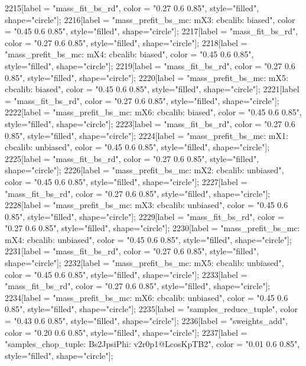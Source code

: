 {	2215[label = "mass_fit_bs_rd", color = "0.27 0.6 0.85", style="filled", shape="circle"];
	2216[label = "mass_prefit_bs_mc\nmassbin: mX3\nmassmodel: cbcalib\ntrigger: biased", color = "0.45 0.6 0.85", style="filled", shape="circle"];
	2217[label = "mass_fit_bs_rd", color = "0.27 0.6 0.85", style="filled", shape="circle"];
	2218[label = "mass_prefit_bs_mc\nmassbin: mX4\nmassmodel: cbcalib\ntrigger: biased", color = "0.45 0.6 0.85", style="filled", shape="circle"];
	2219[label = "mass_fit_bs_rd", color = "0.27 0.6 0.85", style="filled", shape="circle"];
	2220[label = "mass_prefit_bs_mc\nmassbin: mX5\nmassmodel: cbcalib\ntrigger: biased", color = "0.45 0.6 0.85", style="filled", shape="circle"];
	2221[label = "mass_fit_bs_rd", color = "0.27 0.6 0.85", style="filled", shape="circle"];
	2222[label = "mass_prefit_bs_mc\nmassbin: mX6\nmassmodel: cbcalib\ntrigger: biased", color = "0.45 0.6 0.85", style="filled", shape="circle"];
	2223[label = "mass_fit_bs_rd", color = "0.27 0.6 0.85", style="filled", shape="circle"];
	2224[label = "mass_prefit_bs_mc\nmassbin: mX1\nmassmodel: cbcalib\ntrigger: unbiased", color = "0.45 0.6 0.85", style="filled", shape="circle"];
	2225[label = "mass_fit_bs_rd", color = "0.27 0.6 0.85", style="filled", shape="circle"];
	2226[label = "mass_prefit_bs_mc\nmassbin: mX2\nmassmodel: cbcalib\ntrigger: unbiased", color = "0.45 0.6 0.85", style="filled", shape="circle"];
	2227[label = "mass_fit_bs_rd", color = "0.27 0.6 0.85", style="filled", shape="circle"];
	2228[label = "mass_prefit_bs_mc\nmassbin: mX3\nmassmodel: cbcalib\ntrigger: unbiased", color = "0.45 0.6 0.85", style="filled", shape="circle"];
	2229[label = "mass_fit_bs_rd", color = "0.27 0.6 0.85", style="filled", shape="circle"];
	2230[label = "mass_prefit_bs_mc\nmassbin: mX4\nmassmodel: cbcalib\ntrigger: unbiased", color = "0.45 0.6 0.85", style="filled", shape="circle"];
	2231[label = "mass_fit_bs_rd", color = "0.27 0.6 0.85", style="filled", shape="circle"];
	2232[label = "mass_prefit_bs_mc\nmassbin: mX5\nmassmodel: cbcalib\ntrigger: unbiased", color = "0.45 0.6 0.85", style="filled", shape="circle"];
	2233[label = "mass_fit_bs_rd", color = "0.27 0.6 0.85", style="filled", shape="circle"];
	2234[label = "mass_prefit_bs_mc\nmassbin: mX6\nmassmodel: cbcalib\ntrigger: unbiased", color = "0.45 0.6 0.85", style="filled", shape="circle"];
	2235[label = "samples_reduce_tuple", color = "0.43 0.6 0.85", style="filled", shape="circle"];
	2236[label = "sweights_add", color = "0.20 0.6 0.85", style="filled", shape="circle"];
	2237[label = "samples_chop_tuple\nmode: Bs2JpsiPhi\nversion: v2r0p1@LcosKpTB2", color = "0.01 0.6 0.85", style="filled", shape="circle"];
}
